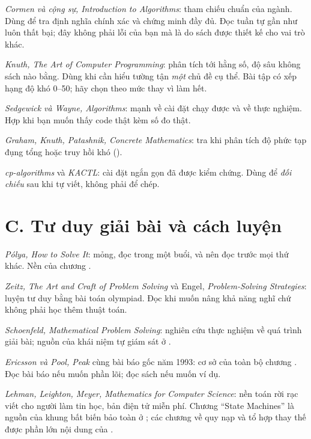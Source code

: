 \documentclass[algorithm.tex]{subfiles}
\begin{document}
\emph{Cormen và cộng sự, \emph{Introduction to Algorithms}}\cite{clrs2022}: tham chiếu chuẩn của ngành. Dùng để tra định nghĩa chính xác và chứng minh đầy đủ. Đọc tuần tự gần như luôn thất bại; đây không phải lỗi của bạn mà là do sách được thiết kế cho vai trò khác.

\emph{Knuth, \emph{The Art of Computer Programming}}\cite{knuth1997v1,knuth1998v3}: phân tích tới hằng số, độ sâu không sách nào bằng. Dùng khi cần hiểu tường tận \emph{một} chủ đề cụ thể. Bài tập có xếp hạng độ khó 0--50; hãy chọn theo mức thay vì làm hết.

\emph{Sedgewick và Wayne, \emph{Algorithms}}\cite{sedgewick2011}: mạnh về cài đặt chạy được và về thực nghiệm. Hợp khi bạn muốn thấy code thật kèm số đo thật.

\emph{Graham, Knuth, Patashnik, \emph{Concrete Mathematics}}\cite{graham1994}: tra khi phân tích độ phức tạp đụng tổng hoặc truy hồi khó ().

\emph{cp-algorithms}\cite{cpalgorithms} và \emph{KACTL}\cite{kactl}: cài đặt ngắn gọn đã được kiểm chứng. Dùng để \emph{đối chiếu} sau khi tự viết, không phải để chép.

\section*{C. Tư duy giải bài và cách luyện}

\emph{Pólya, \emph{How to Solve It}}\cite{polya1945}: mỏng, đọc trong một buổi, và nên đọc trước mọi thứ khác. Nền của chương .

\emph{Zeitz, \emph{The Art and Craft of Problem Solving}}\cite{zeitz2007} và Engel, \emph{Problem-Solving Strategies}\cite{engel1998}: luyện tư duy bằng bài toán olympiad. Đọc khi muốn nâng khả năng nghĩ chứ không phải học thêm thuật toán.

\emph{Schoenfeld, \emph{Mathematical Problem Solving}}\cite{schoenfeld1985}: nghiên cứu thực nghiệm về quá trình giải bài; nguồn của khái niệm tự giám sát ở .

\emph{Ericsson và Pool, \emph{Peak}}\cite{ericsson2016} cùng bài báo gốc năm 1993\cite{ericsson1993}: cơ sở của toàn bộ chương . Đọc bài báo nếu muốn phần lõi; đọc sách nếu muốn ví dụ.

\emph{Lehman, Leighton, Meyer, \emph{Mathematics for Computer Science}}\cite{mcs2018}: nền toán rời rạc viết cho người làm tin học, bản điện tử miễn phí. Chương ``State Machines'' là nguồn của khung bất biến bảo toàn ở ; các chương về quy nạp và tổ hợp thay thế được phần lớn nội dung của .
\end{document}
